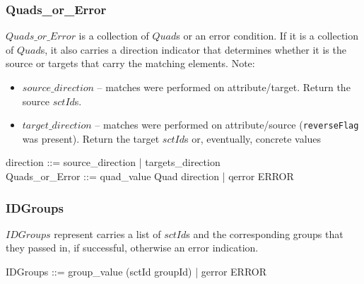 \documentclass{article}
\def\spec#1{{\tt #1}}
\begin{document}
\subsubsection{Quads\_or\_Error}
$Quads\_or\_Error$ is a collection of $Quad$s or an error condition.  If it is a collection of $Quad$s, it also carries a direction indicator that determines
whether it is the source or targets that carry the matching elements.   Note:
\begin{itemize}[noitemsep,nolistsep]
\item \textbf{$source\_direction$} -- matches were performed on attribute/target. Return the source $sctId$s.
\item \textbf{$target\_direction$} -- matches were performed on attribute/source (\spec{reverseFlag} was present).  Return the target $sctId$s or, eventually, concrete values
\end{itemize}

\begin{zed}
direction ::= source\_direction | targets\_direction \\
Quads\_or\_Error ::= quad\_value \ldata \power Quad \cross direction \rdata | qerror \ldata ERROR \rdata
\end{zed}

\subsubsection{IDGroups}
$IDGroups$ represent carries a list of $sctId$s and the corresponding groups that they passed in, if successful, otherwise an error indication.

\begin{zed}
IDGroups ::= group\_value \ldata \power (sctId \cross groupId) \rdata | gerror \ldata ERROR \rdata
\end{zed}
\end{document}
